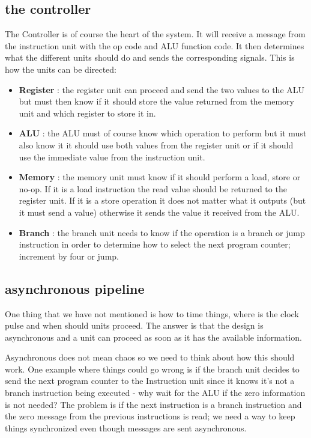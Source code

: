 \documentclass[a4paper,11pt]{article}
\begin{document}
\subsection{the controller}

The Controller is of course the heart of the system. It will receive
a message from the instruction unit with the op code and ALU function
code. It then determines what the different units should do and sends
the corresponding signals. This is how the units can be directed:

\begin{itemize}

\item {\bf Register} : the register unit can proceed and send the two
  values to the ALU but must then know if it should store the value
  returned from the memory unit and which register to store it in.

\item {\bf ALU} : the ALU must of course know which operation to
  perform but it must also know it it should use both values from the
  register unit or if it should use the immediate value from the
  instruction unit.

\item {\bf Memory} : the memory unit must know if it should perform a
  load, store or no-op. If it is a load instruction the read value
  should be returned to the register unit. If it is a store operation
  it does not matter what it outputs (but it must send a value)
  otherwise it sends the value it received from the ALU.

\item {\bf Branch} : the branch unit needs to know if the operation is a
  branch or jump instruction in order to determine how to select the
  next program counter; increment by four or jump.
  
\end{itemize}

\subsection{asynchronous pipeline}

One thing that we have not mentioned is how to time things, where is
the clock pulse and when should units proceed. The answer is that the
design is asynchronous and a unit can proceed as soon as it has the
available information.

Asynchronous does not mean chaos so we need to think about how this
should work. One example where things could go wrong is if the branch
unit decides to send the next program counter to the Instruction unit
since it knows it's not a branch instruction being executed - why wait
for the ALU if the zero information is not needed? The problem is if
the next instruction is a branch instruction and the zero message from
the previous instructions is read; we need a way to keep things
synchronized even though messages are sent asynchronous. 
\end{document}
